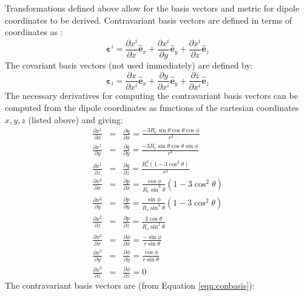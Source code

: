 \documentclass[11pt,letterpaper]{article}
\begin{document}
Transformations defined above allow for the basis vectors and metric for dipole coordinates to be derived.  Contravariant basis vectors are defined in terms of coordinates as \citep[][ Chapter 4]{Arfken7th}:
\begin{equation}
\boldsymbol{\varepsilon}^i = \frac{\partial x^i}{\partial x} \hat{\mathbf{e}}_x + \frac{\partial x^i}{\partial y} \hat{\mathbf{e}}_y + \frac{\partial x^i}{\partial z} \hat{\mathbf{e}}_z \label{eqn:conbasis}
\end{equation}
The covariant basis vectors (not used immediately) are defined by:
\begin{equation}
\boldsymbol{\varepsilon}_i = \frac{\partial x}{\partial x^i} \hat{\mathbf{e}}_x + \frac{\partial y}{\partial x^i} \hat{\mathbf{e}}_y + \frac{\partial z}{\partial x^i} \hat{\mathbf{e}}_z \label{eqn:covbasis}
\end{equation}
The necessary derivatives for computing the contravariant basis vectors can be computed from the dipole coordinates as functions of the cartesian coordinates $x,y,z$ (listed above) and giving:  
\begin{eqnarray}
\frac{\partial x^1}{\partial x} &=& \frac{\partial q}{\partial x} = \frac{-3 R_e \sin \theta \cos \theta \cos \phi}{r^3} \\
\frac{\partial x^1}{\partial y} &=& \frac{\partial q}{\partial y} = \frac{-3 R_e \sin \theta \cos \theta \sin \phi}{r^3} \\
\frac{\partial x^1}{\partial z} &=& \frac{\partial q}{\partial z} = \frac{R_e^2 \left( 1 - 3 \cos^2 \theta \right)}{r^3} \\
\frac{\partial x^2}{\partial x} &=& \frac{\partial p}{\partial x} = \frac{\cos \phi}{ R_e \sin^3 \theta} \left( 1 - 3 \cos^2 \theta \right) \\
\frac{\partial x^2}{\partial y} &=& \frac{\partial p}{\partial y} = \frac{\sin \phi}{ R_e \sin^3 \theta} \left( 1 - 3 \cos^2 \theta \right) \\
\frac{\partial x^2}{\partial z} &=& \frac{\partial p}{\partial z} = \frac{3 \cos \theta}{R_e \sin^2 \theta}\\
\frac{\partial x^3}{\partial x} &=& \frac{\partial \phi}{\partial x} = \frac{- \sin \phi}{r \sin \theta} \\
\frac{\partial x^3}{\partial y} &=& \frac{\partial \phi}{\partial y} = \frac{\cos \phi}{r \sin \theta} \\
\frac{\partial x^3}{\partial z} &=& \frac{\partial \phi}{\partial z} = 0
\end{eqnarray}
The contravariant basis vectors are (from Equation \ref{eqn:conbasis}):
\end{document}
